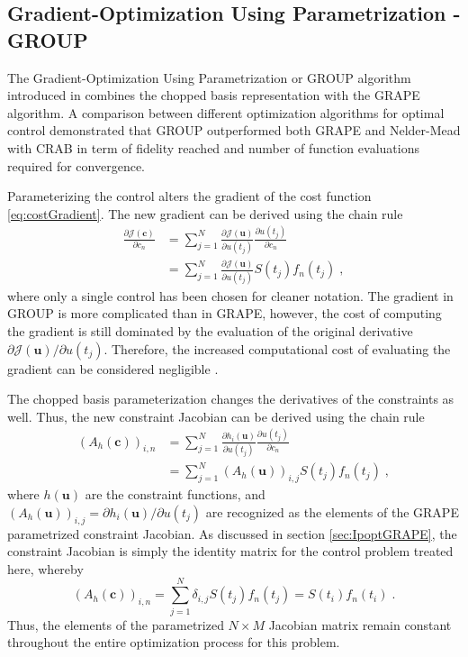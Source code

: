 \subsection{Gradient-Optimization Using Parametrization - GROUP}
The Gradient-Optimization Using Parametrization or \textsc{GROUP} algorithm introduced in \cite{sorensen2018} combines the chopped basis representation with the \textsc{GRAPE} algorithm. A comparison between different optimization algorithms for optimal control demonstrated that \textsc{GROUP} outperformed both \textsc{GRAPE} and Nelder-Mead with \textsc{CRAB} in term of fidelity reached and number of function evaluations required for convergence.

Parameterizing the control alters the gradient of the cost function \eqref{eq:costGradient}. The new gradient can be derived using the chain rule
\begin{align}
	\frac{\partial \mathcal{J} (\boldsymbol{c})}{\partial c_n} &= \sum_{j = 1}^{N} \frac{\partial \mathcal{J} (\boldsymbol{u})}{\partial u(t_j)} \frac{\partial u(t_j)}{\partial c_n} \nonumber \\
	&= \sum_{j = 1}^{N} \frac{\partial \mathcal{J} (\boldsymbol{u} ) }{\partial u(t_j)} S(t_j) f_n(t_j) \; , \label{eq:GROUPgradient} 
\end{align}
where only a single control has been chosen for cleaner notation. The gradient in \textsc{GROUP} is more complicated than in \textsc{GRAPE}, however, the cost of computing the gradient is still dominated by the evaluation of the original derivative ${\partial \mathcal{J} (\boldsymbol{u} ) }/{\partial u(t_j)}$. Therefore, the increased computational cost of evaluating the gradient can be considered negligible \cite{sorensen2018}.

The chopped basis parameterization changes the derivatives of the constraints as well. Thus, the new constraint Jacobian can be derived using the chain rule
\begin{align}
	(A_h (\boldsymbol{c}))_{i,n}  &= \sum_{j = 1}^{N} \frac{\partial h_i (\boldsymbol{u} ) }{\partial u(t_j)} \frac{\partial u(t_j)}{\partial c_n} \nonumber \\
	&= \sum_{j = 1}^{N} (A_h (\boldsymbol{u}))_{i,j} S(t_j) f_n (t_j) \; , \label{eq:GROUPconstJacobian} 
\end{align}
where $h(\boldsymbol{u})$ are the constraint functions, and $(A_h (\boldsymbol{u}))_{i,j} = {\partial h_i (\boldsymbol{u}) } / {\partial u(t_j)}$ are recognized as the elements of the GRAPE parametrized constraint Jacobian. As discussed in section \ref{sec:IpoptGRAPE}, the constraint Jacobian is simply the identity matrix for the control problem treated here, whereby 
\begin{equation}
	(A_h (\boldsymbol{c}))_{i,n} = \sum_{j = 1}^{N} \delta_{i,j} S(t_j) f_n (t_j) = S(t_i) f_n (t_i) \; .
\end{equation} 
Thus, the elements of the parametrized $N \times M$ Jacobian matrix remain constant throughout the entire optimization process for this problem.

